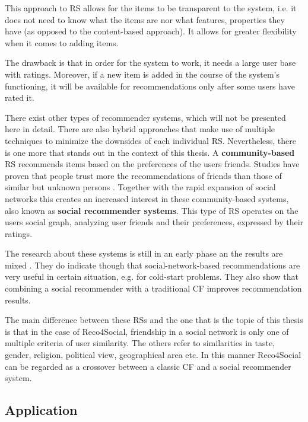 \documentclass[12pt]{report}
\begin{document}
This approach to RS allows for the items to be transparent to the system, i.e. it does not need to know what the items are nor what features, properties they have (as opposed to the content-based approach). It allows for greater flexibility when it comes to adding items.

The drawback is that in order for the system to work, it needs a large user base with ratings. Moreover, if a new item is added in the course of the system's functioning, it will be available for recommendations only after some users have rated it.

\hbox{}
There exist other types of recommender systems, which will not be presented here in detail. There are also hybrid approaches that make use of multiple techniques to minimize the downsides of each individual RS. 
Nevertheless, there is one more that stands out in the context of this thesis. A {\bf community-based} RS recommends items based on the preferences of the users friends. Studies have proven that people trust more the recommendations of friends than those of similar but unknown persons \cite{sinha}. Together with the rapid expansion of social networks this creates an increased interest in these community-based systems, also known as {\bf social recommender systems}. This type of RS operates on the users social graph, analyzing user friends and their preferences, expressed by their ratings.

The research about these systems is still in an early phase an the results are mixed \cite{rec_sys_handbook}. They do indicate though that social-network-based recommendations are very useful in certain situation, e.g. for cold-start problems. They also show that combining a social recommender with a traditional CF improves recommendation results.

The main difference between these RSs and the one that is the topic of this thesis is that in the case of Reco4Social, friendship in a social network is only one of multiple criteria of user similarity. The others refer to similarities in taste, gender, religion, political view, geographical area etc. In this manner Reco4Social can be regarded as a crossover between a classic CF and a social recommender system.

\subsection{Application}
\end{document}
